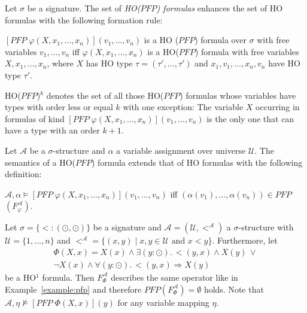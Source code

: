 \begin{definition}
    Let $\sigma$ be a signature. The set of \emph{HO($\mathit{PFP}$) formulas} enhances the set of HO formulas with the
    following formation rule:
    \begin{compactitem}
        \item $[\mathit{PFP}\;\varphi(X, x_1, \dots, x_n)](v_1, \dots, v_n)$ is a HO
        ($\mathit{PFP}$) formula over $\sigma$ with free variables $v_1, \dots, v_n$ iff $\varphi(X, x_1, \dots, x_n)
        $ is a HO($\mathit{PFP}$) formula with free variables $X, x_1, \dots, x_n$, where $X$ has HO type $\tau =
        (\tau', \dots, \tau')$ and $x_1, v_1, \dots, x_n, v_n$ have HO type $\tau'$.
    \end{compactitem}
\end{definition}

HO($\mathit{PFP}$)$^k$ denotes the set of all those HO($\mathit{PFP}$) formulas whose variables have types with
order less or equal $k$ with one exception: The variable $X$ occurring in formulas of kind $[\mathit{PFP}\;\varphi(X, x_1, \dots, x_n)](v_1, \dots, v_n)$ is the only one that can have a type with an order $k+1$.

\begin{definition}
    Let $\mathcal{A}$ be a $\sigma$-structure and $\alpha$ a variable assignment over universe $\mathcal{U}$. The
    semantics of a HO($\mathit{PFP}$) formula extends that of HO formulas with the following definition:
    \begin{compactitem}
        \item $\mathcal{A}, \alpha \models [\mathit{PFP}\;\varphi(X, x_1, \dots, x_n)](v_1, \dots,
        v_n)$ iff $(\alpha(v_1), \dots, \alpha(v_n)) \in \mathit{PFP}$ $(F_\varphi^\mathcal{A})$.
    \end{compactitem}
\end{definition}

\begin{example}
\label{example:ho_pfp}
Let $\sigma = \{ < : (\odot, \odot) \}$ be a signature and $\mathcal{A} = (\mathcal{U}, <^\mathcal{A})$ a $\sigma$-structure with $\mathcal{U} = \{1, \dots, n\}$ and $<^\mathcal{A} = \{(x, y) \mid x, y \in \mathcal{U} \text{ and } x < y\}$. Furthermore, let
\begin{align*}
	\Phi(X,x) = X(x) \wedge \exists (y \colon \odot).\, <(y, x) \wedge X(y)\,\vee \\ 
	\neg X(x) \wedge \forall (y \colon \odot).\, <(y, x) \Rightarrow X(y)
\end{align*}
be a HO$^1$ formula. Then $F_\Phi^\mathcal{A}$ describes the same operator like in Example~\ref{example:pfp} and therefore $PFP(F_\Phi^\mathcal{A}) = \emptyset$ holds. Note that $\mathcal{A}, \eta \not\models [PFP\; \Phi(X, x)](y)$ for any variable mapping $\eta$.
\end{example}